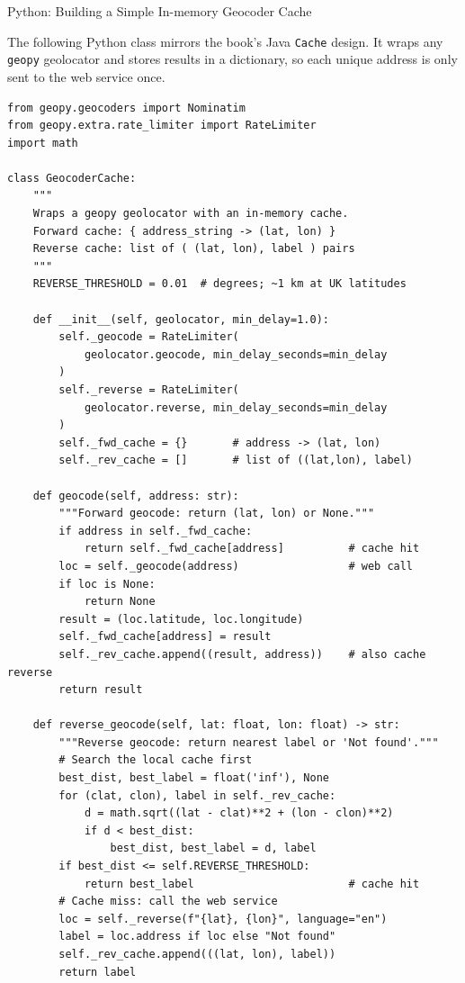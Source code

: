 \documentclass[aspectratio=169,10pt]{beamer}
\begin{document}
\begin{frame}[fragile]{Python: Building a Simple In-memory Geocoder Cache}

  The following Python class mirrors the book's Java \texttt{Cache} design.
  It wraps any \texttt{geopy} geolocator and stores results in a dictionary,
  so each unique address is only sent to the web service once.

\begin{lstlisting}[style=pycode, caption={A simple geocoding cache in Python}]
from geopy.geocoders import Nominatim
from geopy.extra.rate_limiter import RateLimiter
import math

class GeocoderCache:
    """
    Wraps a geopy geolocator with an in-memory cache.
    Forward cache: { address_string -> (lat, lon) }
    Reverse cache: list of ( (lat, lon), label ) pairs
    """
    REVERSE_THRESHOLD = 0.01  # degrees; ~1 km at UK latitudes

    def __init__(self, geolocator, min_delay=1.0):
        self._geocode = RateLimiter(
            geolocator.geocode, min_delay_seconds=min_delay
        )
        self._reverse = RateLimiter(
            geolocator.reverse, min_delay_seconds=min_delay
        )
        self._fwd_cache = {}       # address -> (lat, lon)
        self._rev_cache = []       # list of ((lat,lon), label)

    def geocode(self, address: str):
        """Forward geocode: return (lat, lon) or None."""
        if address in self._fwd_cache:
            return self._fwd_cache[address]          # cache hit
        loc = self._geocode(address)                 # web call
        if loc is None:
            return None
        result = (loc.latitude, loc.longitude)
        self._fwd_cache[address] = result
        self._rev_cache.append((result, address))    # also cache reverse
        return result

    def reverse_geocode(self, lat: float, lon: float) -> str:
        """Reverse geocode: return nearest label or 'Not found'."""
        # Search the local cache first
        best_dist, best_label = float('inf'), None
        for (clat, clon), label in self._rev_cache:
            d = math.sqrt((lat - clat)**2 + (lon - clon)**2)
            if d < best_dist:
                best_dist, best_label = d, label
        if best_dist <= self.REVERSE_THRESHOLD:
            return best_label                        # cache hit
        # Cache miss: call the web service
        loc = self._reverse(f"{lat}, {lon}", language="en")
        label = loc.address if loc else "Not found"
        self._rev_cache.append(((lat, lon), label))
        return label
\end{lstlisting}

\end{frame}
\end{document}

